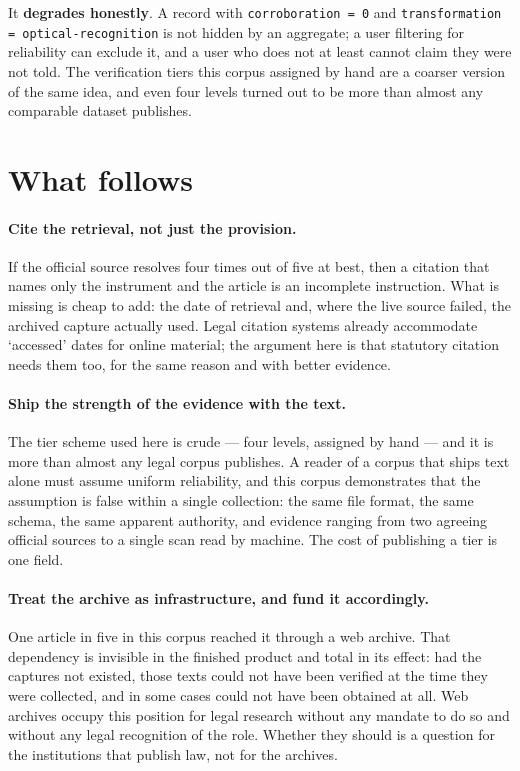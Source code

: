 \documentclass[11pt]{article}
\begin{document}
It \textbf{degrades honestly}. A record with \texttt{corroboration = 0} and
\texttt{transformation = optical-recognition} is not hidden by an aggregate; a
user filtering for reliability can exclude it, and a user who does not at least
cannot claim they were not told. The verification tiers this corpus assigned by
hand are a coarser version of the same idea, and even four levels turned out to
be more than almost any comparable dataset publishes.

\section{What follows}

\paragraph{Cite the retrieval, not just the provision.} If the official source
resolves four times out of five at best, then a citation that names only the
instrument and the article is an incomplete instruction. What is missing is
cheap to add: the date of retrieval and, where the live source failed, the
archived capture actually used. Legal citation systems already accommodate
`accessed' dates for online material; the argument here is that statutory
citation needs them too, for the same reason and with better evidence.

\paragraph{Ship the strength of the evidence with the text.} The tier scheme
used here is crude --- four levels, assigned by hand --- and it is more than
almost any legal corpus publishes. A reader of a corpus that ships text alone
must assume uniform reliability, and this corpus demonstrates that the
assumption is false within a single collection: the same file format, the same
schema, the same apparent authority, and evidence ranging from two agreeing
official sources to a single scan read by machine. The cost of publishing a
tier is one field.

\paragraph{Treat the archive as infrastructure, and fund it accordingly.} One
article in five in this corpus reached it through a web archive. That
dependency is invisible in the finished product and total in its effect: had
the captures not existed, those texts could not have been verified at the time
they were collected, and in some cases could not have been obtained at all.
Web archives occupy this position for legal research without any mandate to do
so and without any legal recognition of the role. Whether they should is a
question for the institutions that publish law, not for the archives.
\end{document}
